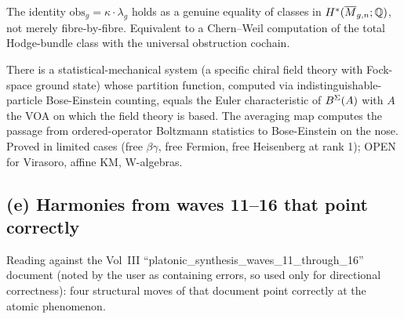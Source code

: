 \begin{conjecture}
\label{wn:conj:opus-final-ThmD}\ClaimStatusConjectured
The identity $\mathrm{obs}_g = \kappa \cdot \lambda_g$ holds as a
genuine equality of classes in
$H^*(\overline{M}_{g,n}; \mathbb{Q})$, not merely fibre-by-fibre. Equivalent to a
Chern--Weil computation of the total Hodge-bundle class with the
universal obstruction cochain.
\end{conjecture}

\begin{conjecture}
\label{wn:conj:opus-final-P1physics}\ClaimStatusConjectured
There is a statistical-mechanical system (a specific chiral
field theory with Fock-space ground state) whose partition function,
computed via indistinguishable-particle Bose-Einstein counting, equals
the Euler characteristic of $B^{\Sigma}(A)$ with $A$ the VOA on which the
field theory is based. The averaging map computes the passage from
ordered-operator Boltzmann statistics to Bose-Einstein
on the nose. Proved in limited cases (free $\beta\gamma$, free Fermion,
free Heisenberg at rank 1); OPEN for Virasoro, affine KM, W-algebras.
\end{conjecture}

\subsection*{(e) Harmonies from waves 11--16 that point correctly}

Reading against the Vol~III ``platonic\_synthesis\_waves\_11\_through\_16''
document (noted by the user as containing errors, so used only for
directional correctness): four structural moves of that document point
correctly at the atomic phenomenon.

